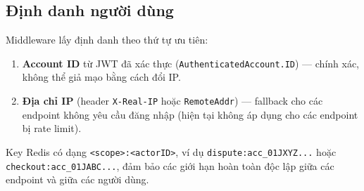 \subsection{Định danh người dùng}

Middleware lấy định danh theo thứ tự ưu tiên:

\begin{enumerate}
  \item \textbf{Account ID} từ JWT đã xác thực (\texttt{AuthenticatedAccount.ID}) — chính xác, không thể giả mạo bằng cách đổi IP.
  \item \textbf{Địa chỉ IP} (header \texttt{X-Real-IP} hoặc \texttt{RemoteAddr}) — fallback cho các endpoint không yêu cầu đăng nhập (hiện tại không áp dụng cho các endpoint bị rate limit).
\end{enumerate}

Key Redis có dạng \texttt{<scope>:<actorID>}, ví dụ \texttt{dispute:acc\_01JXYZ...} hoặc \texttt{checkout:acc\_01JABC...}, đảm bảo các giới hạn hoàn toàn độc lập giữa các endpoint và giữa các người dùng.
